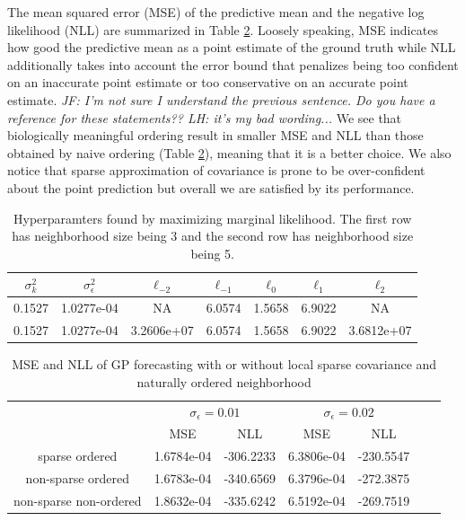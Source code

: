 \documentclass[smallextended,natbib]{svjour3}       %
\begin{document}
The mean squared error (MSE) of the predictive mean and the negative log likelihood (NLL) are summarized in Table \ref{tab:MSE-and-NLL}. Loosely speaking, MSE indicates how good the predictive mean as a point estimate of the ground truth while NLL additionally takes into account the error bound that penalizes being too confident on an inaccurate point estimate or too conservative on an accurate point estimate. \emph{JF: I'm not sure I understand the previous sentence.  Do you have a reference for these statements?? LH: it's my bad wording... } We see that biologically meaningful ordering result in smaller MSE and NLL than those obtained by naive ordering (Table \ref{tab:MSE-and-NLL}), meaning that it is a better choice. We also notice that sparse approximation of covariance is prone to be over-confident about the point prediction but overall we are satisfied by its performance. 

\begin{table}[h]
\begin{center}
\caption{Hyperparamters found by maximizing marginal likelihood. The first row has neighborhood size being 3 and the second row has neighborhood size being 5.}
\label{tab:length scales}
\begin{tabular}{ccccccc} \hline
 $\sigma_{k}^{2}$ & $\sigma_{\epsilon}^{2}$ & $\ell_{-2}$ & $\ell_{-1}$ & $\ell_{0}$ & $\ell_{1}$ & $\ell_{2}$ \\ \hline
0.1527 & 1.0277e-04 & NA & 6.0574 & 1.5658 & 6.9022 & NA\\ 
0.1527 & 1.0277e-04 & 3.2606e+07 & 6.0574 & 1.5658 & 6.9022 & 3.6812e+07\\ \hline
\end{tabular}
\end{center}
\end{table}


\begin{table}[h]
\begin{center}
\caption[MSE and NLL of GP Forecasting with or without Local Sparse Covariance and Naturally Ordered Neighborhood] {MSE and NLL of GP forecasting with or without local sparse covariance and naturally ordered neighborhood}
\label{tab:MSE-and-NLL}
\begin{tabular}{ccccccc} \hline
\multirow{2}{*}{} & \multicolumn{2}{c}{$\sigma_{\epsilon}=0.01$} & \multicolumn{2}{c}{$\sigma_{\epsilon}=0.02$} \\
\cmidrule{2-5} \cmidrule{3-5} \cmidrule{4-5} \cmidrule{5-5} 
 & MSE & NLL & MSE & NLL\\ \hline
sparse ordered & 1.6784e-04 & -306.2233 & 6.3806e-04 & -230.5547 \\
non-sparse ordered & 1.6783e-04 & -340.6569 & 6.3796e-04 & -272.3875 \\
non-sparse non-ordered & 1.8632e-04 & -335.6242 & 6.5192e-04 & -269.7519 \\ \hline
\end{tabular}
\end{center}
\end{table}
\end{document}
